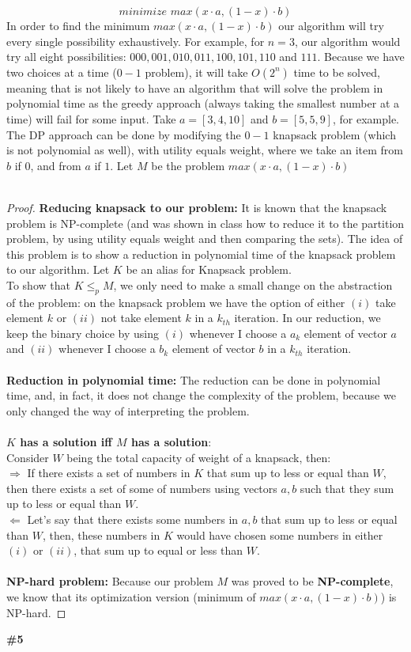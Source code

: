 \documentclass{article}
\begin{document}
$$
\textit{minimize } max(x \cdot a, (1-x) \cdot b)
$$
In order to find the minimum $max(x \cdot a, (1-x) \cdot b)$ our algorithm will try every single possibility exhaustively. For example, for $n = 3$, our algorithm would try all eight possibilities: $000, 001, 010, 011, 100, 101, 110$ and $111$. Because we have two choices at a time ($0-1$ problem), it will take $O(2^n)$ time to be solved, meaning that is not likely to have an algorithm that will solve the problem in polynomial time as the greedy approach (always taking the smallest number at a time) will fail for some input. Take $a=[3, 4, 10]$ and $b=[5,5,9]$, for example. The DP approach can be done by modifying the $0-1$ knapsack problem (which is not polynomial as well), with utility equals weight, where we take an item from $b$ if $0$, and from $a$ if $1$. Let $M$ be the problem $max(x \cdot a, (1-x) \cdot b)$
\\
\\
\begin{proof}
\textbf{Reducing knapsack to our problem:} It is known that the knapsack problem is NP-complete (and was shown in class how to reduce it to the partition problem, by using utility equals weight and then comparing the sets). The idea of this problem is to show a reduction in polynomial time of the knapsack problem to our algorithm. Let $K$ be an alias for Knapsack problem. 
\\
To show that $K \leq_{p} M$, we only need to make a small change on the abstraction of the problem: on the knapsack problem we have the option of either $(i)$ take element $k$ or $(ii)$ not take element $k$ in a $k_{th}$ iteration. In our reduction, we keep the binary choice by using $(i)$ whenever I choose a $a_k$ element of vector $a$ and $(ii)$ whenever I choose a $b_k$ element of vector $b$ in a $k_{th}$ iteration.
\\
\\
\textbf{Reduction in polynomial time:} The reduction can be done in polynomial time, and, in fact, it does not change the complexity of the problem, because we only changed the way of interpreting the problem.
\\
\\
\textbf{$K$ has a solution iff $M$ has a solution}:
\\
Consider $W$ being the total capacity of weight of a knapsack, then:
\\
$\Longrightarrow $ If there exists a set of numbers in $K$ that sum up to less or equal than $W$, then there exists a set of some of numbers using vectors $a, b$ such that they sum up to less or equal than $W$.
\\
$\Longleftarrow $ Let’s say that there exists some numbers in $a, b$ that sum up to less or equal than $W$, then, these numbers in $K$ would have chosen some numbers in either $(i)$ or $(ii)$, that sum up to equal or less than $W$.
\\
\\
\textbf{NP-hard problem:} Because our problem $M$ was proved to be \textbf{NP-complete}, we know that its optimization version (minimum of $max(x \cdot a, (1-x) \cdot b)$) is NP-hard.
\end{proof}
\textbf{\#5}
\\
\end{document}
